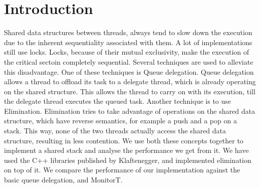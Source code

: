 \section{Introduction}
Shared data structures between threads, always tend to slow down the execution due to the inherent sequentiality associated with them. A lot of implementations still use locks. Locks, because of their mutual exclusivity, make the execution of the critical sectoin completely sequential. Several techniques are used to alleviate this disadvantage. One of these techniques is Queue delegation. Queue delegation allows a thread to offload its task to a delegate thread, which is already operating on the shared structure. This allows the thread to carry on with its execution, till the delegate thread executes the queued task. Another technique is to use Elimination. Elimination tries to take advantage of operations on the shared data structure, which have reverse semantics, for example a push and a pop on a stack. This way, none of the two threads actually access the shared data structure, resulting in less contention. 
We use both these concepts together to implement a shared stack and analyse the performance we get from it. We have used the C++ libraries published by Klaftenegger, and implemented elimination on top of it. We compare the performance of our implementation against the basic queue delegation, and MonitorT.


